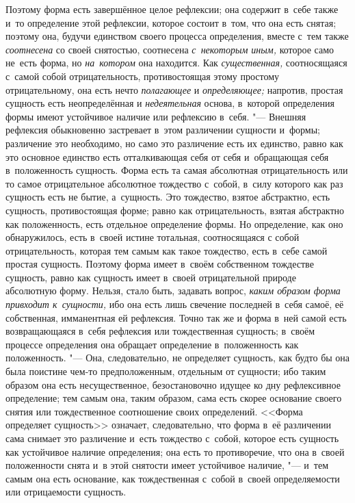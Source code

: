 Поэтому форма есть завершённое целое рефлексии; она содержит в~себе также и~то
определение этой рефлексии, которое состоит в~том, что она есть снятая; поэтому
она, будучи единством своего процесса определения, вместе с~тем также
{\em соотнесена} со своей снятостью, соотнесена {\em с~некоторым иным,}
которое само не~есть форма, но {\em на~котором} она находится. Как
{\em существенная,} соотносящаяся с~самой собой отрицательность, противостоящая
этому простому отрицательному, она есть нечто {\em полагающее} и
{\em определяющее;} напротив, простая сущность есть неопределённая и
{\em недеятельная} основа, в~которой определения формы имеют устойчивое наличие
или рефлексию в~себя. "--- Внешняя рефлексия обыкновенно застревает в~этом
различении сущности и~формы; различение это необходимо, но само это различение
есть их единство, равно как это основное единство есть отталкивающая себя от
себя и~обращающая себя в~положенность сущность. Форма есть та самая абсолютная
отрицательность или то самое отрицательное абсолютное тождество с~собой, в~силу
которого как раз сущность есть не бытие, а~сущность. Это тождество, взятое
абстрактно, есть сущность, противостоящая форме; равно как отрицательность,
взятая абстрактно как положенность, есть отдельное определение формы. Но
определение, как оно обнаружилось, есть в~своей истине тотальная, соотносящаяся
с собой отрицательность, которая тем самым как такое тождество, есть в~себе
самой простая сущность. Поэтому форма имеет в~своём собственном тождестве
сущность, равно как сущность имеет в~своей отрицательной природе абсолютную
форму. Нельзя, стало быть, задавать вопрос,
{\em каким образом форма привходит к~сущности,} ибо она есть лишь свечение
последней в~себя самоё, её собственная, имманентная ей рефлексия. Точно так же
и форма в~ней самой есть возвращающаяся в~себя рефлексия или тождественная
сущность; в~своём процессе определения она обращает определение в~положенность
как положенность. "--- Она, следовательно, не определяет сущность, как будто бы
она была поистине чем-то предположенным, отдельным от сущности; ибо таким
образом она есть несущественное, безостановочно идущее ко дну рефлексивное
определение; тем самым она, таким образом, сама есть скорее основание своего
снятия или тождественное соотношение своих определений. <<Форма определяет
сущность>> означает, следовательно, что форма в~её различении сама снимает это
различение и~есть тождество с~собой, которое есть сущность как устойчивое
наличие определения; она есть то противоречие, что она в~своей положенности
снята и~в этой снятости имеет устойчивое наличие, "--- и~тем самым она есть
основание, как тождественная с~собой в~своей определяемости или отрицаемости
сущность.

